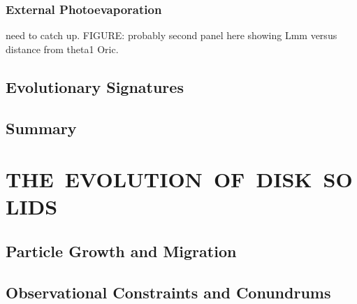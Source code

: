 \documentclass[a4paper]{ar-1col}
\begin{document}
\subsubsection{External Photoevaporation}
need to catch up.  FIGURE: probably second panel here showing Lmm versus distance from theta1 Oric.



\subsection{Evolutionary Signatures}


\subsection{Summary}


\section{THE\ EVOLUTION\ OF\ DISK\ SOLIDS} \label{sec:solids}


\subsection{Particle Growth and Migration}
 

\subsection{Observational Constraints and Conundrums}
\end{document}
